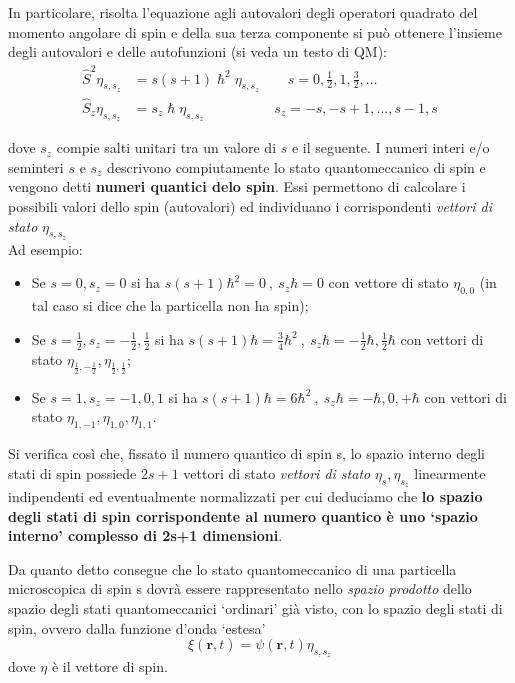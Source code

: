In particolare, risolta l'equazione agli autovalori degli operatori
quadrato del momento angolare di spin e della sua terza componente si
può ottenere l'insieme degli autovalori e delle autofunzioni (si veda un testo di QM):
\begin{equation}
    \begin{aligned}
        \hat{S}^{2} \eta_{s,s_{z}} &= s (s+1) \hslash^{2} \eta_{s,s_{z}} \qquad s = 0, \frac{1}{2}, 1, \frac{3}{2}, \dots \\
        \hat{S}_{z} \eta_{s,s_{z}} &= s_{z} \hslash \eta_{s,s_{z}} \qquad \qquad \quad s_{z} = -s, -s+1, \dots , s-1, s
    \end{aligned}
    \label{eq:eigenvalue-eq-spin}
\end{equation}

dove \(s_{z}\) compie salti unitari tra un valore di \(s\) e il
seguente.
I numeri interi e/o seminteri $s$ e $s_{z}$ descrivono compiutamente lo stato quantomeccanico di spin e vengono detti \textbf{numeri quantici delo spin}.
Essi permettono di calcolare i possibili valori dello spin (autovalori) ed individuano i corrispondenti \emph{vettori di stato} $\eta_{s,s_{z}}$ \\
Ad esempio:
\begin{itemize}
    \item Se $s = 0,s_{z}=0$ si ha $s(s+1) \hbar^{2} = 0 \ , \ s_{z}\hbar = 0$ con vettore di stato $\eta_{0,0}$ (in tal caso si dice che la particella non ha spin);
    \item Se $s=\frac{1}{2}, s_{z} = -\frac{1}{2}, \frac{1}{2}$ si ha $s(s+1)\hbar = \frac{3}{4} \hbar^{2} \ , \ s_{z}\hbar = -\frac{1}{2}\hbar, \frac{1}{2} \hbar$ con vettori di stato $\eta_{\frac{1}{2} , - \frac{1}{2}} , \eta_{\frac{1}{2}, \frac{1}{2}}$;
    \item Se $s=1 , s_{z} = -1,0,1$ si ha $s(s+1)\hbar = 6\hbar^{2} \ , \ s_{z}\hbar = - \hbar,0, +\hbar$ con vettori di stato $\eta_{1,-1}, \eta_{1,0},\eta_{1,1}$.
\end{itemize}
Si verifica così che, fissato il numero quantico di spin s, lo spazio interno degli stati di spin possiede
$2s+1$ vettori di stato \emph{vettori di stato} $\eta_{s},\eta_{s_{z}}$ linearmente indipendenti ed eventualmente normalizzati per cui deduciamo che \textbf{lo spazio degli stati di spin corrispondente al numero quantico  è uno ‘spazio interno’ complesso di 2s+1 dimensioni}.
\bigskip

Da quanto detto consegue che lo stato quantomeccanico di una particella
microscopica di spin s dovrà essere rappresentato nello \emph{spazio
prodotto} dello spazio degli stati quantomeccanici `ordinari' già visto,
con lo spazio degli stati di spin, ovvero dalla funzione d'onda `estesa'
\[
    \xi(\bm{r},t) =   \psi(\bm{r},t) \eta_{s,s_{z}}
\] dove \(\eta\) è il vettore di spin.

